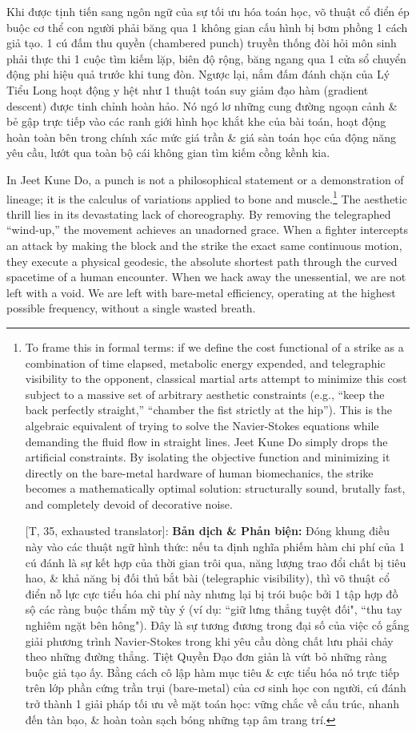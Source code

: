\documentclass[11pt]{article}
\begin{document}
Khi được tịnh tiến sang ngôn ngữ của sự tối ưu hóa toán học, võ thuật cổ điển ép buộc cơ thể con người phải băng qua 1 không gian cấu hình bị bơm phồng 1 cách giả tạo. 1 cú đấm thu quyền (chambered punch) truyền thống đòi hỏi môn sinh phải thực thi 1 cuộc tìm kiếm lặp, biên độ rộng, băng ngang qua 1 cửa sổ chuyển động phi hiệu quả trước khi tung đòn. Ngược lại, nắm đấm đánh chặn của Lý Tiểu Long hoạt động y hệt như 1 thuật toán suy giảm đạo hàm (gradient descent) được tinh chỉnh hoàn hảo. Nó ngó lơ những cung đường ngoạn cảnh \& bẻ gập trực tiếp vào các ranh giới hình học khắt khe của bài toán, hoạt động hoàn toàn bên trong chính xác mức giá trần \& giá sàn toán học của động năng yêu cầu, lướt qua toàn bộ cái không gian tìm kiếm cồng kềnh kia.

In Jeet Kune Do, a punch is not a philosophical statement or a demonstration of lineage; it is the calculus of variations applied to bone and muscle.\footnote{To frame this in formal terms: if we define the cost functional of a strike as a combination of time elapsed, metabolic energy expended, and telegraphic visibility to the opponent, classical martial arts attempt to minimize this cost subject to a massive set of arbitrary aesthetic constraints (e.g., ``keep the back perfectly straight,'' ``chamber the fist strictly at the hip''). This is the algebraic equivalent of trying to solve the Navier-Stokes equations while demanding the fluid flow in straight lines. Jeet Kune Do simply drops the artificial constraints. By isolating the objective function and minimizing it directly on the bare-metal hardware of human biomechanics, the strike becomes a mathematically optimal solution: structurally sound, brutally fast, and completely devoid of decorative noise.
	
	\textsf{[T, 35, exhausted translator]:} \textbf{Bản dịch \& Phản biện:} Đóng khung điều này vào các thuật ngữ hình thức: nếu ta định nghĩa phiếm hàm chi phí của 1 cú đánh là sự kết hợp của thời gian trôi qua, năng lượng trao đổi chất bị tiêu hao, \& khả năng bị đối thủ bắt bài (telegraphic visibility), thì võ thuật cổ điển nỗ lực cực tiểu hóa chi phí này nhưng lại bị trói buộc bởi 1 tập hợp đồ sộ các ràng buộc thẩm mỹ tùy ý (ví dụ: ``giữ lưng thẳng tuyệt đối", ``thu tay nghiêm ngặt bên hông"). Đây là sự tương đương trong đại số của việc cố gắng giải phương trình Navier-Stokes trong khi yêu cầu dòng chất lưu phải chảy theo những đường thẳng. Tiệt Quyền Đạo đơn giản là vứt bỏ những ràng buộc giả tạo ấy. Bằng cách cô lập hàm mục tiêu \& cực tiểu hóa nó trực tiếp trên lớp phần cứng trần trụi (bare-metal) của cơ sinh học con người, cú đánh trở thành 1 giải pháp tối ưu về mặt toán học: vững chắc về cấu trúc, nhanh đến tàn bạo, \& hoàn toàn sạch bóng những tạp âm trang trí.} The aesthetic thrill lies in its devastating lack of choreography. By removing the telegraphed ``wind-up,'' the movement achieves an unadorned grace. When a fighter intercepts an attack by making the block and the strike the exact same continuous motion, they execute a physical geodesic, the absolute shortest path through the curved spacetime of a human encounter. When we hack away the unessential, we are not left with a void. We are left with bare-metal efficiency, operating at the highest possible frequency, without a single wasted breath.
\end{document}
